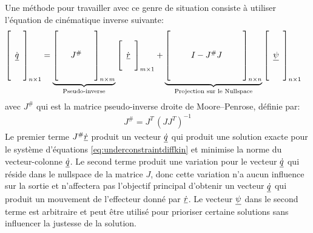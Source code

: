 Une méthode pour travailler avec ce genre de situation consiste à utiliser l'équation de cinématique inverse suivante:
\begin{align}
\left[ \begin{array}{c}  \\ \\ \dot{\underline{q}} \\ \\ \\
\end{array} \right]_{n \times 1}
&= 
\underbrace{
\left[ \begin{array}{c c c} 
&&\\ &&\\ & J^{\#} & \\&& \\ &&
\end{array} \right]_{n \times m}
}_{\text{Pseudo-inverse}}
\left[ \begin{array}{c} 
\\ \dot{\underline{r}} \\ \\
\end{array} \right]_{m \times 1} + 
\underbrace{
\left[ \begin{array}{c c c c c} 
&&&&\\ &&&&\\ && I - J^{\#}J && \\&&&& \\ &&&&
\end{array} \right]_{n \times n}
}_{\text{Projection sur le Nullspace}}
\left[ \begin{array}{c} 
\\ \\ \underline{\psi} \\ \\ \\
\end{array} \right]_{n \times 1}
\label{eq:pseudoinversediffkin}
\end{align} 
avec $J^{\#}$ qui est la matrice pseudo-inverse droite de Moore–Penrose, définie par:
\begin{align}
J^{\#} = J^T\, (JJ^T)^{-1}
\end{align} 
Le premier terme $J^{\#} \underline{\dot{r}}$ produit un vecteur $\underline{\dot{q}}$ qui produit une solution exacte pour le système d'équations \eqref{eq:underconstraintdiffkin}
et minimise la norme du vecteur-colonne $\underline{\dot{q}}$. Le second terme produit une variation pour le vecteur $\underline{\dot{q}}$ qui réside dans le nullspace de la matrice $J$, donc cette variation n'a aucun influence sur la sortie et n’affectera pas l'objectif principal d'obtenir un vecteur $\underline{\dot{q}}$ qui produit un mouvement de l'effecteur donné par $\underline{\dot{r}}$. Le vecteur $\underline{\psi}$ dans le second terme est arbitraire et peut être utilisé pour prioriser certaine solutions sans influencer la justesse de la solution. 



